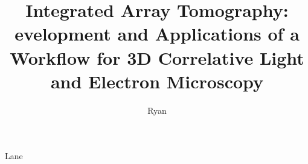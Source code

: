 \documentclass{thesis}
\begin{document}
\newcommand{\needref}{[\textit{\textcolor{orange}{references}}]}


\title{Integrated Array Tomography: \texorpdfstring{\\}
Development and Applications of a Workflow for 3D Correlative Light and Electron Microscopy}
\author{Ryan}{Lane}

\frontmatter  %
% 

% 



% 


\end{document}
